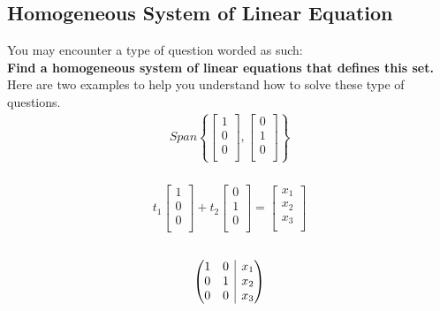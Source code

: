 \documentclass[12pt]{article}
\makeatletter
\newenvironment{amatrix}[1]{%
  \left(\begin{array}{@{}*{#1}{c}|c@{}}
}{%
  \end{array}\right)
}
\makeatother
\begin{document}
\subsection{Homogeneous System of Linear Equation}
You may encounter a type of question worded as such:\\
\textbf{Find a homogeneous system of linear equations that defines this set.}\\
Here are two examples to help you understand how to solve these type of questions.
\\
\begin{equation}
\begin{split}
Span
\left\{\begin{bmatrix}
1 \\
0 \\
0 \\
\end{bmatrix},
\begin{bmatrix}
0 \\
1 \\
0 \\
\end{bmatrix}\right\}
\end{split}
\end{equation}
\\
\begin{equation}
\begin{split}
t_1\begin{bmatrix}
1 \\
0 \\
0 \\
\end{bmatrix}
+
t_2\begin{bmatrix}
0 \\
1 \\
0 \\
\end{bmatrix}
=
\begin{bmatrix}
x_1 \\
x_2 \\
x_3 \\
\end{bmatrix}
\end{split}
\end{equation}
\\
\begin{equation}
\begin{amatrix}{2}
1 & 0 & x_1 \\ 0 & 1 & x_2 \\ 0 & 0 & x_3
\end{amatrix}
\end{equation}\\
\end{document}
